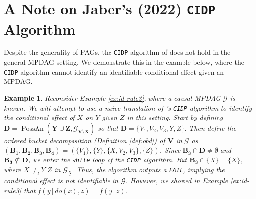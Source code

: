 \documentclass[11pt]{article}
\DeclareMathOperator{\PossAn}{PossAn}
\newtheorem{example}{Example}
\newcommand{\mb}[1]{\mathbf{#1}}
\newcommand{\dsepp}{\perp_{d}}
\newcommand{\g}[1][G]{\mathcal{#1}}
\begin{document}
\section{A Note on Jaber's (2022) \texttt{CIDP} Algorithm}
\label{rem-cidp}

Despite the generality of PAGs, the \texttt{CIDP} algorithm of \cite{jaber2022causal} does not hold in the general MPDAG setting. We demonstrate this in the example below, where the \texttt{CIDP} algorithm cannot identify an identifiable conditional effect given an MPDAG.

\begin{example}
\label{ex:cidp}
    Reconsider Example \ref{ex:id-rule3}, where a causal MPDAG $\g$ is known. We will attempt to use a naive translation of \citeauthor{jaber2022causal}'s \texttt{CIDP} algorithm to identify the conditional effect of $X$ on $Y$ given $Z$ in this setting. Start by defining $\mb{D} = \PossAn(\mb{Y} \cup \mb{Z}, \g_{\mb{V} \setminus \mb{X}})$ so that $\mb{D} = \{V_1, V_2, V_3, Y, Z\}$. Then define the ordered bucket decomposition (Definition \ref{def:obd}) of $\mb{V}$ in $\g$ as $(\mb{B_1},\mb{B_2}, \mb{B_3}, \mb{B_4}) = (\{V_1\}, \{Y\}, \{X, V_2, V_3 \}, \{Z\})$. Since $\mb{B_3} \cap \mb{D} \neq \emptyset$ and $\mb{B_3} \not\subseteq \mb{D}$, we enter the \texttt{while} loop of the \texttt{CIDP} algorithm. But $\mb{B_3} \cap \{X\} = \{X\}$, where $X \not \dsepp Y | Z$ in $\g_{\underline{X}}$. Thus, the algorithm outputs a \texttt{FAIL}, implying the conditional effect is not identifiable in $\g$. However, we showed in Example \ref{ex:id-rule3} that $f(y \,|\, do(x),z) = f(y \,|\, z)$.
\end{example}










\vskip 0.2in


\end{document}
